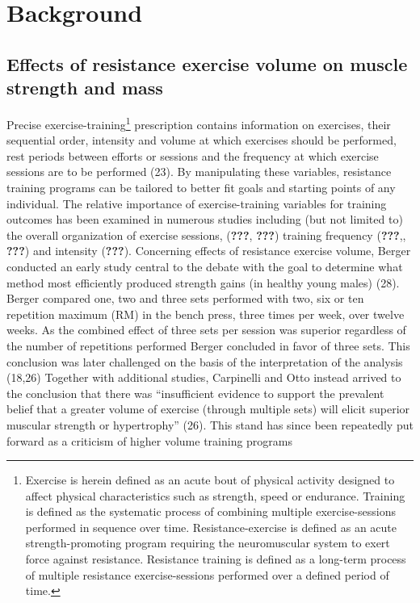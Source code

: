 \documentclass[twoside,10pt]{gihclass} %
\begin{document}
\hypertarget{background}{%
\chapter{Background}\label{background}}

\hypertarget{effects-of-resistance-exercise-volume-on-muscle-strength-and-mass}{%
\section{Effects of resistance exercise volume on muscle strength and mass}\label{effects-of-resistance-exercise-volume-on-muscle-strength-and-mass}}

Precise exercise-training\footnote{Exercise is herein defined as an acute bout of physical activity designed to affect physical characteristics such as strength, speed or endurance. Training is defined as the systematic process of combining multiple exercise-sessions performed in sequence over time. Resistance-exercise is defined as an acute strength-promoting program requiring the neuromuscular system to exert force against resistance. Resistance training is defined as a long-term process of multiple resistance exercise-sessions performed over a defined period of time.}
prescription contains information on exercises, their sequential order, intensity and volume at which exercises should be performed, rest periods between efforts or sessions and the frequency at which exercise sessions are to be performed
(23).
By manipulating these variables, resistance training programs can be tailored to better fit goals and starting points of any individual.
The relative importance of exercise-training variables for training outcomes has been examined in numerous studies including (but not limited to) the overall organization of exercise sessions,
({\textbf{???}}, {\textbf{???}})
training frequency
({\textbf{???}},, {\textbf{???}})
and intensity
({\textbf{???}}).
Concerning effects of resistance exercise volume, Berger conducted an early study central to the debate with the goal to determine what method most efficiently produced strength gains (in healthy young males) (28). Berger compared one, two and three sets performed with two, six or ten repetition maximum (RM) in the bench press, three times per week, over twelve weeks. As the combined effect of three sets per session was superior regardless of the number of repetitions performed Berger concluded in favor of three sets. This conclusion was later challenged on the basis of the interpretation of the analysis
(18,26)
Together with additional studies, Carpinelli and Otto instead arrived to the conclusion that there was ``insufficient evidence to support the prevalent belief that a greater volume of exercise (through multiple sets) will elicit superior muscular strength or hypertrophy'' (26). This stand has since been repeatedly put forward as a criticism of higher volume training programs
\end{document}
